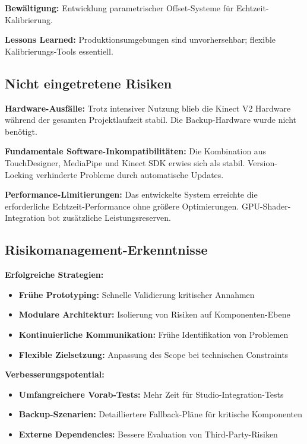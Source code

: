 \textbf{Bewältigung:} Entwicklung parametrischer Offset-Systeme für Echtzeit-Kalibrierung.

\textbf{Lessons Learned:} Produktionsumgebungen sind unvorhersehbar; flexible Kalibrierungs-Tools essentiell.

\subsection{Nicht eingetretene Risiken}

\textbf{Hardware-Ausfälle:}
Trotz intensiver Nutzung blieb die Kinect V2 Hardware während der gesamten Projektlaufzeit stabil. Die Backup-Hardware wurde nicht benötigt.

\textbf{Fundamentale Software-Inkompatibilitäten:}
Die Kombination aus TouchDesigner, MediaPipe und Kinect SDK erwies sich als stabil. Version-Locking verhinderte Probleme durch automatische Updates.

\textbf{Performance-Limitierungen:}
Das entwickelte System erreichte die erforderliche Echtzeit-Performance ohne größere Optimierungen. GPU-Shader-Integration bot zusätzliche Leistungsreserven.

\subsection{Risikomanagement-Erkenntnisse}

\textbf{Erfolgreiche Strategien:}
\begin{itemize}
    \item \textbf{Frühe Prototyping:} Schnelle Validierung kritischer Annahmen
    \item \textbf{Modulare Architektur:} Isolierung von Risiken auf Komponenten-Ebene
    \item \textbf{Kontinuierliche Kommunikation:} Frühe Identifikation von Problemen
    \item \textbf{Flexible Zielsetzung:} Anpassung des Scope bei technischen Constraints
\end{itemize}

\textbf{Verbesserungspotential:}
\begin{itemize}
    \item \textbf{Umfangreichere Vorab-Tests:} Mehr Zeit für Studio-Integration-Tests
    \item \textbf{Backup-Szenarien:} Detailliertere Fallback-Pläne für kritische Komponenten
    \item \textbf{Externe Dependencies:} Bessere Evaluation von Third-Party-Risiken
\end{itemize}

